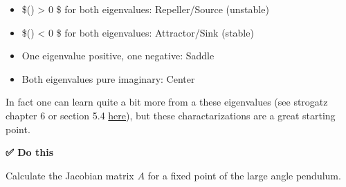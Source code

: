 \begin{itemize}
\tightlist
\item
  \$(\lambda) \textgreater{} 0 \$ for both eigenvalues:
  Repeller/Source (unstable)
\item
  \$(\lambda) \textless{} 0 \$ for both eigenvalues:
  Attractor/Sink (stable)
\item
  One eigenvalue positive, one negative: Saddle
\item
  Both eigenvalues pure imaginary: Center
\end{itemize}

In fact one can learn quite a bit more from a these eigenvalues (see
strogatz chapter 6 or section 5.4
\href{https://users.math.msu.edu/users/gnagy/teaching/ode.pdf}{here}),
but these charactarizations are a great starting point.

\begin{Shaded}
\begin{Highlighting}[]

\end{Highlighting}
\end{Shaded}

\textbf{✅ Do this}

Calculate the Jacobian matrix \(A\) for a fixed point of the large angle
pendulum.
